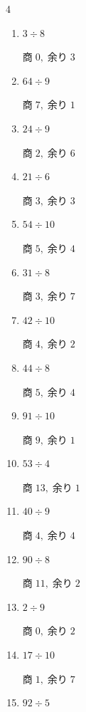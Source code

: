 \begin{multicols}{4}
\begin{enumerate}
  \item $3 \div 8$

        $商\; 0,\; 余り\; 3$

  \item $64 \div 9$

        $商\; 7,\; 余り\; 1$

  \item $24 \div 9$

        $商\; 2,\; 余り\; 6$

  \item $21 \div 6$

        $商\; 3,\; 余り\; 3$

  \item $54 \div 10$

        $商\; 5,\; 余り\; 4$

  \item $31 \div 8$

        $商\; 3,\; 余り\; 7$

  \item $42 \div 10$

        $商\; 4,\; 余り\; 2$

  \item $44 \div 8$

        $商\; 5,\; 余り\; 4$

  \item $91 \div 10$

        $商\; 9,\; 余り\; 1$

\columnbreak %

\resetques

  \item $53 \div 4$

        $商\; 13,\; 余り\; 1$

  \item $40 \div 9$

        $商\; 4,\; 余り\; 4$

  \item $90 \div 8$

        $商\; 11,\; 余り\; 2$

  \item $2 \div 9$

        $商\; 0,\; 余り\; 2$

  \item $17 \div 10$

        $商\; 1,\; 余り\; 7$

  \item $92 \div 5$


\end{enumerate}
\end{multicols}
